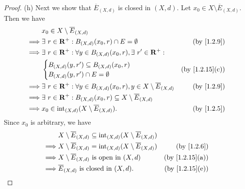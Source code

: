 \begin{proof}{(h)}
  Next we show that \(\overline{E}_{(X, d)}\) is closed in \((X, d)\).
  Let \(x_0 \in X \setminus \overline{E}_{(X, d)}\).
  Then we have
  \begin{align*}
             & x_0 \in X \setminus \overline{E}_{(X, d)}                                                                                  \\
    \implies & \exists\ r \in \R^+ : B_{(X, d)}(x_0, r) \cap E = \emptyset                                     & \text{(by \cref{1.2.9})} \\
    \implies & \exists\ r \in \R^+ : \forall y \in B_{(X, d)}(x_0, r), \exists\ r' \in \R^+ :                                             \\
             & \begin{cases}
                 B_{(X, d)}(y, r') \subseteq B_{(X, d)}(x_0, r) \\
                 B_{(X, d)}(y, r') \cap E = \emptyset
               \end{cases}                                               & \text{(by \cref{1.2.15}(c))}                                   \\
    \implies & \exists\ r \in \R^+ : \forall y \in B_{(X, d)}(x_0, r), y \in X \setminus \overline{E}_{(X, d)} & \text{(by \cref{1.2.9})} \\
    \implies & \exists\ r \in \R^+ : B_{(X, d)}(x_0, r) \subseteq X \setminus \overline{E}_{(X, d)}                                       \\
    \implies & x_0 \in \text{int}_{(X, d)}(X \setminus \overline{E}_{(X, d)}).                                 & \text{(by \cref{1.2.5})}
  \end{align*}
  Since \(x_0\) is arbitrary, we have
  \begin{align*}
             & X \setminus \overline{E}_{(X, d)} \subseteq \text{int}_{(X, d)}(X \setminus \overline{E}_{(X, d)})                                \\
    \implies & X \setminus \overline{E}_{(X, d)} = \text{int}_{(X, d)}(X \setminus \overline{E}_{(X, d)})         & \text{(by \cref{1.2.6})}     \\
    \implies & X \setminus \overline{E}_{(X, d)} \text{ is open in } (X, d)                                       & \text{(by \cref{1.2.15}(a))} \\
    \implies & \overline{E}_{(X, d)} \text{ is closed in } (X, d).                                                & \text{(by \cref{1.2.15}(e))}
  \end{align*}


\end{proof}
